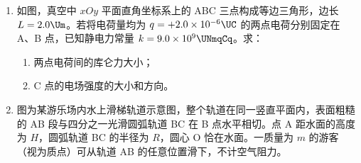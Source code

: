 \documentclass[\gkver]{gaokaozhenti}
\begin{document}
\begin{enumerate}
{（2）①改装电流表扩大量程 $I = I_{g} + \frac{I_{g} r}{R}$，$R = \frac{I_{g} r}{I - I_{g}} = 1.0\UO$。②对照电路图，逐个回路连接即可，如图所示。


③$r = \frac{\frac{U_{5} - U_{1}}{I_{5} - I_{1}} + \frac{U_{6} - U_{2}}{I_{6} - I_{2}} + \frac{U_{7} - U_{3}}{I_{7} - I_{3}} + \frac{U_{8} - U_{4}}{I_{8} - I_{4}}}{4} = 1.66\UO$，这样做的优点可以利用每一组数据。④电压表的读数等于路端电压，所以电压表内阻对测量结果没有影响，选项 A 错误；滑动变阻器用来改变路端电压，对测量结果没有影响，选项 B 错误；若 $R_{1}$ 的实际阻值偏小，则电流表的实际量程偏大，电流表的读数比实际值偏小，电池组的内阻测量值偏大，选项 C 正确；$R_{0}$ 的实际阻值偏大时，电池组的实际内阻比测量值偏小，选项 D 正确。
}

\item
如图，真空中 $xOy$ 平面直角坐标系上的 ABC 三点构成等边三角形，边长 $L = 2.0\Um$。若将电荷量均为 $q = +2.0\times10^{-6}\UC$ 的两点电荷分别固定在 A、B 点，已知静电力常量 $k = 9.0\times10^{9}\UNmqCq$。求：

\begin{enumerate}
	\item
	两点电荷间的库仑力大小；
	\item
	C 点的电场强度的大小和方向。
\end{enumerate}


\item
图为某游乐场内水上滑梯轨道示意图，整个轨道在同一竖直平面内，表面粗糙的 AB 段与四分之一光滑圆弧轨道 BC 在 B 点水平相切。点 A 距水面的高度为 $H$，圆弧轨道 BC 的半径为 $R$，圆心 O 恰在水面。一质量为 $m$ 的游客（视为质点）可从轨道 AB 的任意位置滑下，不计空气阻力。


\end{enumerate}
\end{document}
